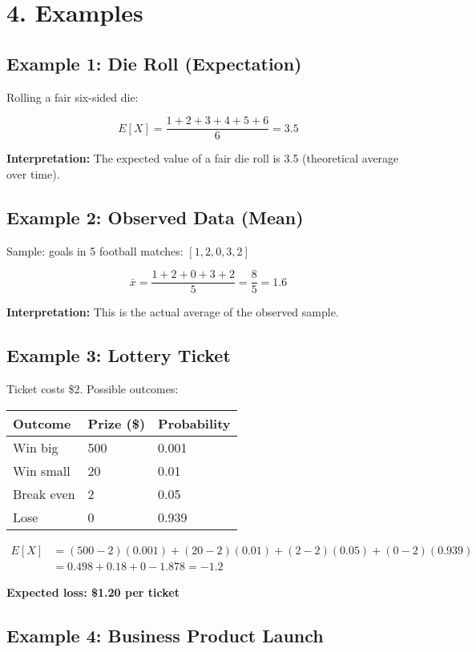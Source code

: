 \documentclass[12pt]{article}
\begin{document}
\section*{4. Examples}

\subsection*{Example 1: Die Roll (Expectation)}

Rolling a fair six-sided die:

\[
E[X] = \frac{1 + 2 + 3 + 4 + 5 + 6}{6} = 3.5
\]

\textbf{Interpretation:} The expected value of a fair die roll is 3.5 (theoretical average over time).

\subsection*{Example 2: Observed Data (Mean)}

Sample: goals in 5 football matches: \([1, 2, 0, 3, 2]\)

\[
\bar{x} = \frac{1 + 2 + 0 + 3 + 2}{5} = \frac{8}{5} = 1.6
\]

\textbf{Interpretation:} This is the actual average of the observed sample.

\subsection*{Example 3: Lottery Ticket}

Ticket costs \$2. Possible outcomes:

\begin{tabular}{lll}
\toprule
Outcome & Prize (\$) & Probability \\
\midrule
Win big & 500 & 0.001 \\
Win small & 20 & 0.01 \\
Break even & 2 & 0.05 \\
Lose & 0 & 0.939 \\
\bottomrule
\end{tabular}

\[
\begin{aligned}
E[X] &= (500 - 2)(0.001) + (20 - 2)(0.01) + (2 - 2)(0.05) + (0 - 2)(0.939) \\
&= 0.498 + 0.18 + 0 - 1.878 = -1.2
\end{aligned}
\]

\textbf{Expected loss: \$1.20 per ticket}

\subsection*{Example 4: Business Product Launch}
\end{document}
